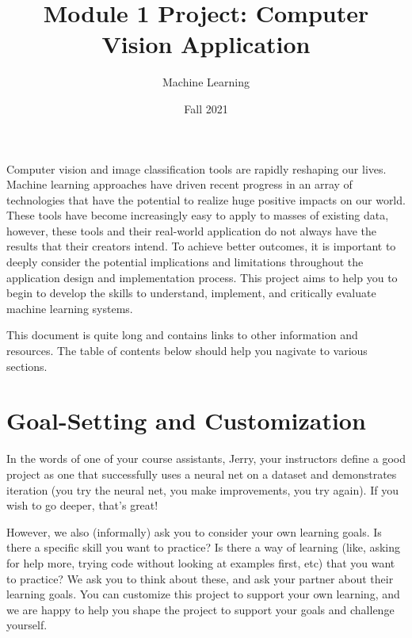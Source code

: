 \documentclass{tufte-handout}
\title{Module 1 Project: Computer Vision Application}
\author{Machine Learning}
\date{Fall 2021}
\begin{document}
\maketitle
\thispagestyle{firstpage}

Computer vision and image classification tools are rapidly reshaping our lives. Machine learning approaches have driven recent progress in an array of technologies that have the potential to realize huge positive impacts on our world. These tools have become increasingly easy to apply to masses of existing data, however, these tools and their real-world application do not always have the results that their creators intend. To achieve better outcomes, it is important to deeply consider the potential implications and limitations throughout the application design and implementation process. This project aims to help you to begin to develop the skills to understand, implement, and critically evaluate machine learning systems. 

This document is quite long and contains links to other information and resources. The table of contents below should help you nagivate to various sections.

%

\tableofcontents

\pagebreak

\section{Goal-Setting and Customization}

In the words of one of your course assistants, Jerry, your instructors define a good project as one that successfully uses a neural net on a dataset and demonstrates iteration (you try the neural net, you make improvements, you try again). If you wish to go deeper, that's great!

However, we also (informally) ask you to consider your own learning goals. Is there a specific skill you want to practice? Is there a way of learning (like, asking for help more, trying code without looking at examples first, etc) that you want to practice? We ask you to think about these, and ask your partner about their learning goals.  You can customize this project to support your own learning, and we are happy to help you shape the project to support your goals and challenge yourself. 
\end{document}
